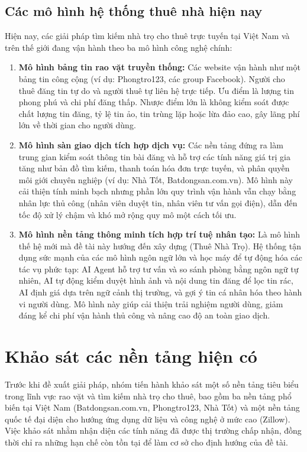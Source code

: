 \FloatBarrier
\subsection{Các mô hình hệ thống thuê nhà hiện nay}

Hiện nay, các giải pháp tìm kiếm nhà trọ cho thuê trực tuyến tại Việt Nam và trên thế giới đang vận hành theo ba mô hình công nghệ chính:
\begin{enumerate}
    \item \textbf{Mô hình bảng tin rao vặt truyền thống:} Các website vận hành như một bảng tin công cộng (ví dụ: Phongtro123, các group Facebook). Người cho thuê đăng tin tự do và người thuê tự liên hệ trực tiếp. Ưu điểm là lượng tin phong phú và chi phí đăng thấp. Nhược điểm lớn là không kiểm soát được chất lượng tin đăng, tỷ lệ tin ảo, tin trùng lặp hoặc lừa đảo cao, gây lãng phí lớn về thời gian cho người dùng.
    \item \textbf{Mô hình sàn giao dịch tích hợp dịch vụ:} Các nền tảng đứng ra làm trung gian kiểm soát thông tin bài đăng và hỗ trợ các tính năng giá trị gia tăng như bản đồ tìm kiếm, thanh toán hóa đơn trực tuyến, và phân quyền môi giới chuyên nghiệp (ví dụ: Nhà Tốt, Batdongsan.com.vn). Mô hình này cải thiện tính minh bạch nhưng phần lớn quy trình vận hành vẫn chạy bằng nhân lực thủ công (nhân viên duyệt tin, nhân viên tư vấn gọi điện), dẫn đến tốc độ xử lý chậm và khó mở rộng quy mô một cách tối ưu.
    \item \textbf{Mô hình nền tảng thông minh tích hợp trí tuệ nhân tạo:} Là mô hình thế hệ mới mà đề tài này hướng đến xây dựng (Thuê Nhà Trọ). Hệ thống tận dụng sức mạnh của các mô hình ngôn ngữ lớn và học máy để tự động hóa các tác vụ phức tạp: AI Agent hỗ trợ tư vấn và so sánh phòng bằng ngôn ngữ tự nhiên, AI tự động kiểm duyệt hình ảnh và nội dung tin đăng để lọc tin rác, AI định giá dựa trên ngữ cảnh thị trường, và gợi ý tin cá nhân hóa theo hành vi người dùng. Mô hình này giúp cải thiện trải nghiệm người dùng, giảm đáng kể chi phí vận hành thủ công và nâng cao độ an toàn giao dịch.
\end{enumerate}

\section{Khảo sát các nền tảng hiện có}

Trước khi đề xuất giải pháp, nhóm tiến hành khảo sát một số nền tảng tiêu biểu trong lĩnh vực rao vặt và tìm kiếm nhà trọ cho thuê, bao gồm ba nền tảng phổ biến tại Việt Nam (Batdongsan.com.vn, Phongtro123, Nhà Tốt) và một nền tảng quốc tế đại diện cho hướng ứng dụng dữ liệu và công nghệ ở mức cao (Zillow). Việc khảo sát nhằm nhận diện các tính năng đã được thị trường chấp nhận, đồng thời chỉ ra những hạn chế còn tồn tại để làm cơ sở cho định hướng của đề tài.

